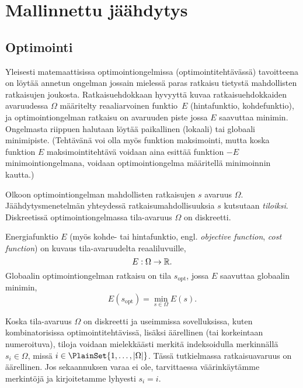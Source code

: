 \chapter{Mallinnettu jäähdytys}
\label{cha:simulated_annealing_algoritmi}

\section{Optimointi}
\label{sec:optimointi}

Yleisesti matemaattisissa optimointiongelmissa (optimointitehtävässä) tavoitteena on löytää annetun ongelman jossain mielessä paras ratkaisu tietystä mahdollisten ratkaisujen joukosta.
Ratkaisuehdokkaan hyvyyttä kuvaa ratkaisuehdokkaiden avaruudessa $\Omega$ määritelty reaaliarvoinen funktio~$E$ (hintafunktio, kohdefunktio),
ja optimointiongelman ratkaisu on avaruuden piste jossa $E$ saavuttaa minimin.
Ongelmasta riippuen halutaan löytää paikallinen (lokaali) tai globaali minimipiste.
(Tehtävänä voi olla myös funktion maksimointi,
mutta koska funktion $E$ maksimointitehtävä voidaan aina esittää funktion $-E$ minimointiongelmana,
voidaan optimointiongelma määritellä minimoinnin kautta.)

\begin{maar}
    \label{maar:globaali_optimointiongelma}
    Olkoon optimointiongelman mahdollisten ratkaisujen $s$ avaruus $\Omega$.
    Jäähdytysmenetelmän yhteydessä ratkaisumahdollisuuksia $s$ kutsutaan \emph{tiloiksi}.
    Diskreetissä optimointiongelmassa tila-avaruus $\Omega$ on diskreetti.

    Energiafunktio $E$ (myös kohde- tai hintafunktio, engl. \emph{objective function}, \emph{cost function}) on kuvaus tila-avaruudelta reaaliluvuille,
    \begin{equation}
        E: \Omega \to \mathbb{R}.
    \end{equation}
    Globaalin optimointiongelman ratkaisu on tila $s_\text{opt}$, jossa $E$ saavuttaa globaalin minimin,
    \begin{equation}
        \label{eq:energiafunktion_minimi}
        E(s_\text{opt}) = \min_{s\in\Omega} E(s).
    \end{equation}
\end{maar}

\begin{merk}
    Koska tila-avaruus $\Omega$ on diskreetti ja useimmissa sovelluksissa,
    kuten kombinatorisissa optimointitehtävissä, lisäksi äärellinen (tai korkeintaan numeroituva),
    tiloja voidaan mielekkäästi merkitä indeksoidulla merkinnällä $s_i \in \Omega$,
    missä $i \in \PlainSet{1, \dots, \abs{\Omega}}$.
    Tässä tutkielmassa ratkaisuavaruus on äärellinen.
    Jos sekaannuksen varaa ei ole, tarvittaessa väärinkäytämme merkintöjä ja  kirjoitetamme lyhyesti $s_i = i$.
\end{merk}

